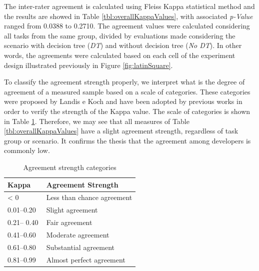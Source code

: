 
The inter-rater agreement is calculated using Fleiss Kappa statistical method and the results are showed in Table \ref{tbl:overallKappaValues}, with associated \textit{p-Value} ranged from 0.0388 to 0.2710. The agreement values were calculated considering all tasks from the same group, divided by evaluations made considering the scenario with decision tree (\textit{DT}) and without decision tree (\textit{No DT}). In other words, the agreements were calculated based on each cell of the experiment design illustrated previously in Figure \ref{fig:latinSquare}. 

To classify the agreement strength properly, we interpret what is the degree of agreement of a measured sample based on a scale of categories. These categories were proposed by Landis e Koch \cite{landis1977measurement} and have been adopted by previous works \cite{schumacher2010building,zhang2011code} in order to verify the strength of the Kappa value. The scale of categories is shown in Table \ref{tbl:agreementClassification}. Therefore, we may see that all measures of Table \ref{tbl:overallKappaValues} have a slight agreement strength, regardless of task group or scenario. It confirms the thesis \cite{hozano2018you} that the agreement among developers is commonly low. 

\begin{table}[ht]
\centering
\begin{tabular}{ll} 
\toprule
Kappa & Agreement Strength~ \\ 
\midrule
\textless{} 0 & Less than chance agreement \\
0.01–0.20~ & Slight agreement~ \\
0.21– 0.40 & Fair agreement \\
0.41–0.60 & Moderate agreement \\
0.61–0.80 & Substantial agreement \\
0.81–0.99 & Almost perfect agreement \\
\bottomrule
\end{tabular}
\caption{Agreement strength categories}
\label{tbl:agreementClassification}
\end{table}

